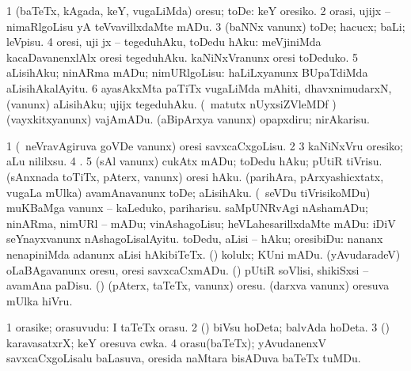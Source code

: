 {{{{{{\bentry
{} 
\gl{\sakirx}
\expl{}
\bmng
\bnum
\num{1} (baTeTx, kAgada, keY, \mo vugaLiMda) oresu; toDe:  keY oresiko. 
\num{2} orasi, ujijx -- nimaRlgoLisu yA teVvavillxdaMte mADu. 
\num{3} (baNNx \mo vanunx) toDe; hacucx; baLi; leVpisu. 
\num{4} oresi, uji jx -- tegeduhAku, toDedu hAku:  meVjiniMda kacaDavanenxlAlx oresi tegeduhAku.  kaNiNxVranunx oresi toDeduko. 
\num{5} aLisihAku; ninARma mADu; nimURlgoLisu:  haLiLxyanunx BUpaTdiMda aLisihAkalAyitu. 
\num{6} ayasAkxMta paTiTx \mo vugaLiMda mAhiti, dhavxnimudarxN, (\mo vanunx) aLisihAku; ujijx tegeduhAku. 
 (\AseTxrXV\ matutx nUyxsiZVleMDf \ashi) 
\banum
{} (vayxkitxyanunx) vajAmADu. 
 (aBipArxya \mo vanunx) opapxdiru; nirAkarisu. 
\eanum
\numie
\enum
\emng

\noindent
\gl{\pagu}
\bmng
\bnum
\num{1}  (\kanmu\ neVravAgiruva goVDe \mo vanunx) oresi savxcaCxgoLisu. 
\num{2}  
\num{3}  kaNiNxVru oresiko; aLu nililxsu. 
\num{4}  . 
\num{5}  (sAl \mo vanunx) cukAtx mADu; toDedu hAku; pUtiR tiVrisu. 
  
\banum
{} (sAnxnada toTiTx, pAterx, \mo vanunx) oresi hAku. 
 (parihAra, pArxyashicxtatx, \mo vugaLa mUlka) avamAnavanunx toDe; aLisihAku. 
 (\kanmu\ seVDu tiVrisikoMDu) muKBaMga \mo vanunx -- kaLeduko, pariharisu. 
 saMpUNRvAgi nAshamADu; ninARma, nimURl -- mADu; vinAshagoLisu; heVLahesarillxdaMte mADu:  iDiV seYnayxvanunx nAshagoLisalAyitu. 
 toDedu, aLisi -- hAku; oresibiDu:  nananx nenapiniMda adanunx aLisi hAkibiTeTx. 
 (\ashi) kolulx; KUni mADu. 
 (yAvudaradeV) oLaBAgavanunx oresu, oresi savxcaCxmADu. 
\eanum
\numie
{} 
\banum
{}  (\AmA) pUtiR soVlisi, shikiSxsi -- avamAna paDisu. 
  
\eanum
\numie
{}  
\banum
{} (\birx) (pAterx, taTeTx, \mo vanunx) oresu. 
 (darxva \mo vanunx) oresuva mUlka hiVru. 
\eanum
\numie
\enum
\emng
\eentry

\bentry
{}
\gl{\nA}
\bmng
\bnum
\num{1} orasike; orasuvudu:  I taTeTx orasu. 
\num{2} (\ashi) biVsu hoDeta; balvAda hoDeta. 
\num{3} (\ashi) karavasatxrX; keY oresuva cwka. 
\num{4} orasu(baTeTx); yAvudanenxV savxcaCxgoLisalu baLasuva, oresida naMtara bisADuva baTeTx tuMDu. 
\enum
\emng
\eentry

}}}}}}
